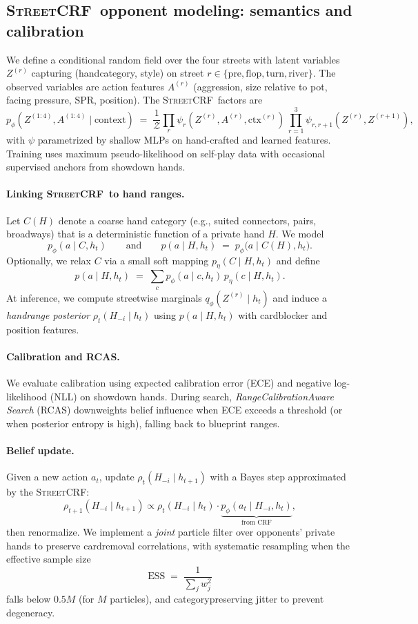 \documentclass[10pt]{article}
\newcommand{\sCRF}{\textsc{Street\textendash CRF}\xspace} %
\newcommand{\1}{\mathbf{1}}
\theoremstyle{plain}
\begin{document}
\subsection{\sCRF\ opponent modeling: semantics and calibration}
We define a conditional random field over the four streets with latent variables $Z^{(r)}$ capturing (hand\textendash category, style) on street $r\in\{\text{pre},\text{flop},\text{turn},\text{river}\}$. The observed variables are action features $A^{(r)}$ (aggression, size relative to pot, facing pressure, SPR, position). The \sCRF\ factors are
\[
p_\phi(Z^{(1:4)}, A^{(1:4)}\mid \text{context}) \;=\; \frac{1}{\mathcal{Z}} \prod_{r} \psi_r\!\left(Z^{(r)},A^{(r)},\text{ctx}^{(r)}\right)\, \prod_{r=1}^{3} \psi_{r,r+1}(Z^{(r)},Z^{(r+1)}),
\]
with $\psi$ parametrized by shallow MLPs on hand-crafted and learned features. Training uses maximum pseudo-likelihood on self-play data with occasional supervised anchors from showdown hands.

\paragraph{Linking \sCRF\ to hand ranges.}
Let $C(H)$ denote a coarse hand category (e.g., suited connectors, pairs, broadways) that is a deterministic function of a private hand $H$. We model
\[
  p_\phi(a\mid C,h_t)\qquad\text{and}\qquad p(a\mid H,h_t)\;=\;p_\phi\!\big(a\mid C(H),h_t\big).
\]
Optionally, we relax $C$ via a small soft mapping $p_\eta(C\mid H,h_t)$ and define
\[
  p(a\mid H,h_t)\;=\;\sum_{c} p_\phi(a\mid c,h_t)\,p_\eta(c\mid H,h_t).
\]
At inference, we compute street\textendash wise marginals $q_\phi(Z^{(r)}\mid h_t)$ and induce a \emph{hand\textendash range posterior} $\rho_t(H_{-i}\mid h_t)$ using $p(a\mid H,h_t)$ with card\textendash blocker and position features.

\paragraph{Calibration and RCAS.}
We evaluate calibration using expected calibration error (ECE) and negative log-likelihood (NLL) on showdown hands. During search, \emph{Range\textendash Calibration\textendash Aware Search} (RCAS) down\textendash weights belief influence when ECE exceeds a threshold (or when posterior entropy is high), falling back to blueprint ranges.

\paragraph{Belief update.}
Given a new action $a_t$, update $\rho_t(H_{-i}\mid h_{t+1})$ with a Bayes step approximated by the \sCRF:
\[
\rho_{t+1}(H_{-i}\mid h_{t+1}) \propto \rho_t(H_{-i}\mid h_t) \cdot \underbrace{p_\phi(a_t \mid H_{-i}, h_t)}_{\text{from CRF}},
\]
then renormalize. We implement a \emph{joint} particle filter over opponents' private hands to preserve card\textendash removal correlations, with systematic resampling when the effective sample size
\[
  \mathrm{ESS} \;=\; \frac{1}{\sum_j w_j^2}
\]
falls below $0.5M$ (for $M$ particles), and category\textendash preserving jitter to prevent degeneracy.
\end{document}
